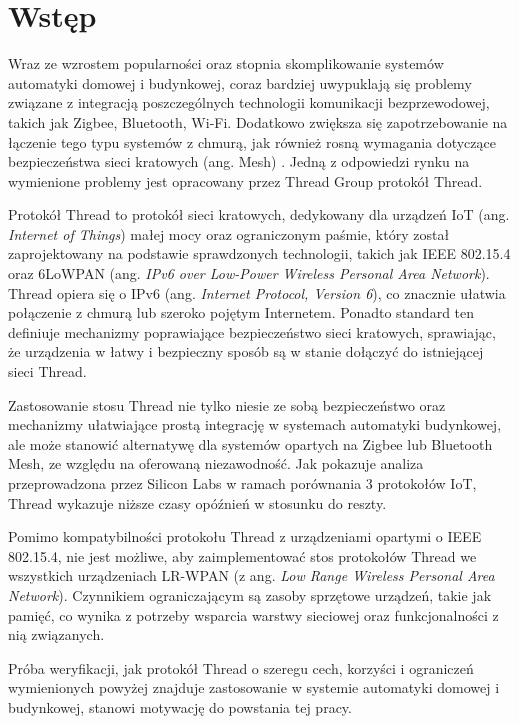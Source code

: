 \chapter*{Wstęp}
\label{cha:wstep}

Wraz ze wzrostem popularności oraz stopnia skomplikowanie systemów automatyki domowej i budynkowej, coraz bardziej uwypuklają się problemy związane z integracją poszczególnych technologii komunikacji bezprzewodowej, takich jak Zigbee, Bluetooth, Wi-Fi. Dodatkowo zwiększa się zapotrzebowanie na łączenie tego typu systemów z chmurą, jak również rosną wymagania dotyczące bezpieczeństwa sieci kratowych (ang. Mesh) \cite{thread-smart-home}. Jedną z odpowiedzi rynku na wymienione problemy jest opracowany przez Thread Group protokół Thread.

Protokół Thread to protokół sieci kratowych, dedykowany dla urządzeń IoT (ang. \textit{Internet of Things}) małej mocy oraz ograniczonym paśmie, który został zaprojektowany na podstawie sprawdzonych technologii, takich jak IEEE 802.15.4 oraz 6LoWPAN (ang. \textit{IPv6 over Low-Power Wireless Personal Area Network}). Thread opiera się o IPv6 (ang. \textit{Internet Protocol, Version 6}), co znacznie ułatwia połączenie z chmurą lub szeroko pojętym Internetem. Ponadto standard ten definiuje mechanizmy poprawiające bezpieczeństwo sieci kratowych, sprawiając, że urządzenia w łatwy i bezpieczny sposób są w stanie dołączyć do istniejącej sieci Thread.

Zastosowanie stosu Thread nie tylko niesie ze sobą bezpieczeństwo oraz mechanizmy ułatwiające prostą integrację w systemach automatyki budynkowej, ale może stanowić alternatywę dla systemów opartych na Zigbee lub Bluetooth Mesh, ze względu na oferowaną niezawodność. Jak pokazuje analiza przeprowadzona przez Silicon Labs \cite{thread-bt-zigbee-comparison} w ramach porównania 3 protokołów IoT, Thread wykazuje niższe czasy opóźnień w stosunku do reszty.

Pomimo kompatybilności protokołu Thread z urządzeniami opartymi o IEEE 802.15.4, nie jest możliwe, aby zaimplementować stos protokołów Thread we wszystkich urządzeniach LR-WPAN (z ang. \textit{Low Range Wireless Personal Area Network}). Czynnikiem ograniczającym są zasoby sprzętowe urządzeń, takie jak pamięć, co wynika z potrzeby wsparcia warstwy sieciowej oraz funkcjonalności z nią związanych.

Próba weryfikacji, jak protokół Thread o szeregu cech, korzyści i ograniczeń wymienionych powyżej znajduje zastosowanie w systemie automatyki domowej i budynkowej, stanowi motywację do powstania tej pracy.

